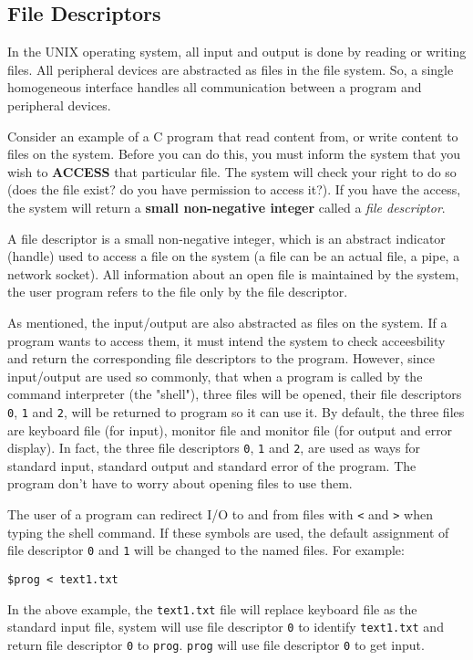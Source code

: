 \documentclass[12pt]{article}
\begin{document}
\subsection{File Descriptors}
\label{sec:orge948826}
In the UNIX operating system, all input and output is done by reading or writing files. All peripheral devices are abstracted as files in the file system. So, a single homogeneous interface handles all communication between a program and peripheral devices.

Consider an example of a C program that read content from, or write content to files on the system. Before you can do this, you must inform the system that you wish to \textbf{ACCESS} that particular file. The system will check your right to do so (does the file exist? do you have permission to access it?). If you have the access, the system will return a \textbf{small non-negative integer} called a \emph{file descriptor}.

A file descriptor is a small non-negative integer, which is an abstract indicator (handle) used to access a file on the system (a file can be an actual file, a pipe, a network socket). All information about an open file is maintained by the system, the user program refers to the file only by the file descriptor.

As mentioned, the input/output are also abstracted as files on the system. If a program wants to access them, it must intend the system to check acceesbility and return the corresponding file descriptors to the program. However, since input/output are used so commonly, that when a program is called by the command interpreter (the "shell"), three files will be opened, their file descriptors \texttt{0}, \texttt{1} and \texttt{2}, will be returned to program so it can use it. By default, the three files are keyboard file (for input), monitor file and monitor file (for output and error display). In fact, the three file descriptors \texttt{0}, \texttt{1} and \texttt{2}, are used as ways for standard input, standard output and standard error of the program. The program don't have to worry about opening files to use them.

The user of a program can redirect I/O to and from files with \texttt{<} and \texttt{>} when typing the shell command. If these symbols are used, the default assignment of file descriptor \texttt{0} and \texttt{1} will be changed to the named files. For example:
\begin{verbatim}
$prog < text1.txt
\end{verbatim}
In the above example, the \texttt{text1.txt} file will replace keyboard file as the standard input file, system will use file descriptor \texttt{0} to identify \texttt{text1.txt} and return file descriptor \texttt{0} to \texttt{prog}. \texttt{prog} will use file descriptor \texttt{0} to get input.
\end{document}
